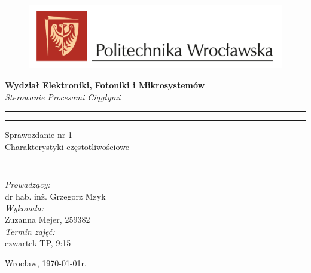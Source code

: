 \begin{titlepage}
\begin{figure}
    \centering
    \includegraphics[width=18cm]{../../logo-PWr.png}
    \label{fig:pwr}
\end{figure}
    \begin{center}
        \LARGE \textbf{ Wydział Elektroniki, Fotoniki i Mikrosystemów }\\ 
        \vspace{70pt}
        \Huge \textit{ Sterowanie Procesami Ciągłymi}  \\
    \end{center}
    \vspace{30pt}
    \hrule
    \vspace{1pt}
    \hrule
    \begin{center}
        {\fontsize{30}{50}\selectfont Sprawozdanie nr 1\\ }
        \vspace{10pt}
        {\fontsize{25}{25}\selectfont Charakterystyki częstotliwościowe  }
    \end{center}
    \hrule
    \vspace{1pt}
    \hrule
    \begin{flushright}
        \vspace{50pt}

        \textit{\Large Prowadzący:}\\
        \Large dr hab. inż. Grzegorz Mzyk\\
        \vspace{10pt}
        \textit{\Large Wykonała:}\\
        \Large Zuzanna Mejer, 259382 \\
        \vspace{10pt}
        \textit{\Large Termin zajęć:}\\
        \Large czwartek TP, 9:15\\
        \vspace{10pt}
    
    \end{flushright}
    \vspace{60pt}
    \begin{center}
        \large Wrocław, \today r.
    \end{center}
\end{titlepage}
    
    